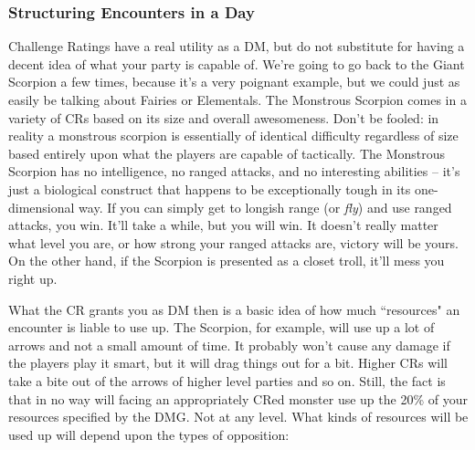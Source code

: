 \subsubsection{Structuring Encounters in a Day}

Challenge Ratings have a real utility as a DM, but do not substitute for having a decent idea of what your party is capable of. We're going to go back to the Giant Scorpion a few times, because it's a very poignant example, but we could just as easily be talking about Fairies or Elementals. The Monstrous Scorpion comes in a variety of CRs based on its size and overall awesomeness. Don't be fooled: in reality a monstrous scorpion is essentially of identical difficulty regardless of size based entirely upon what the players are capable of tactically. The Monstrous Scorpion has no intelligence, no ranged attacks, and no interesting abilities -- it's just a biological construct that happens to be exceptionally tough in its one-dimensional way. If you can simply get to longish range (or \textit{fly}) and use ranged attacks, you win. It'll take a while, but you will win. It doesn't really matter what level you are, or how strong your ranged attacks are, victory will be yours. On the other hand, if the Scorpion is presented as a closet troll, it'll mess you right up.

What the CR grants you as DM then is a basic idea of how much ``resources" an encounter is liable to use up. The Scorpion, for example, will use up a lot of arrows and not a small amount of time. It probably won't cause any damage if the players play it smart, but it will drag things out for a bit. Higher CRs will take a bite out of the arrows of higher level parties and so on. Still, the fact is that in no way will facing an appropriately CRed monster use up the 20\% of your resources specified by the DMG. Not at any level. What kinds of resources will be used up will depend upon the types of opposition:

